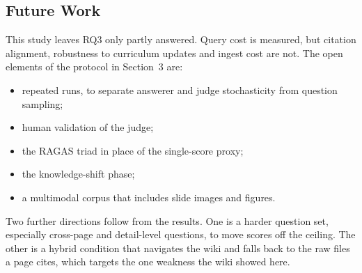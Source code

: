 \documentclass[letterpaper]{article} %
\begin{document}
\subsection{Future Work}

This study leaves RQ3 only partly answered. Query cost is measured, but citation alignment, robustness to curriculum updates and ingest cost are not. The open elements of the protocol in Section~3 are:
\begin{itemize}
\item repeated runs, to separate answerer and judge stochasticity from question sampling;
\item human validation of the judge;
\item the RAGAS triad in place of the single-score proxy;
\item the knowledge-shift phase;
\item a multimodal corpus that includes slide images and figures.
\end{itemize}
Two further directions follow from the results. One is a harder question set, especially cross-page and detail-level questions, to move scores off the ceiling. The other is a hybrid condition that navigates the wiki and falls back to the raw files a page cites, which targets the one weakness the wiki showed here.


\end{document}
